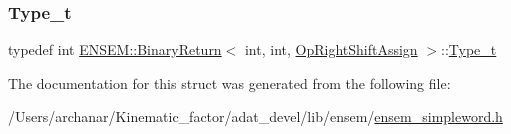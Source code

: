\mbox{\label{structENSEM_1_1BinaryReturn_3_01int_00_01int_00_01OpRightShiftAssign_01_4_aee34dbba921ba57b3f70c5f4d289e88d}} 
\subsubsection{\texorpdfstring{Type\_t}{Type\_t}\hspace{0.1cm}{\footnotesize\ttfamily [2/2]}}
{\footnotesize\ttfamily typedef int \mbox{\hyperlink{structENSEM_1_1BinaryReturn}{E\+N\+S\+E\+M\+::\+Binary\+Return}}$<$ int, int, \mbox{\hyperlink{structENSEM_1_1OpRightShiftAssign}{Op\+Right\+Shift\+Assign}} $>$\+::\mbox{\hyperlink{structENSEM_1_1BinaryReturn_3_01int_00_01int_00_01OpRightShiftAssign_01_4_aee34dbba921ba57b3f70c5f4d289e88d}{Type\+\_\+t}}}



The documentation for this struct was generated from the following file\+:\begin{DoxyCompactItemize}
\item 
/\+Users/archanar/\+Kinematic\+\_\+factor/adat\+\_\+devel/lib/ensem/\mbox{\hyperlink{lib_2ensem_2ensem__simpleword_8h}{ensem\+\_\+simpleword.\+h}}\end{DoxyCompactItemize}
